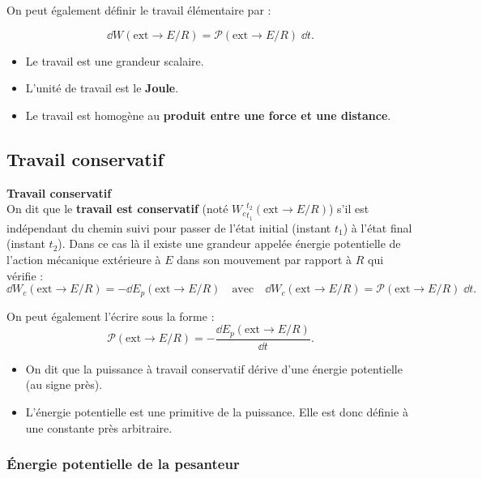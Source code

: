 \begin{rem}%
On peut également définir le travail élémentaire par :

$$\dd W(\text{ext} \rightarrow E/R)=\mathcal{P}(\text{ext} \rightarrow E/R)\;\dd t.
$$

\begin{itemize}
\item Le travail est une grandeur scalaire.
\item L'unité de travail est le \textbf{Joule}.
\item Le travail est homogène au \textbf{produit entre une force et une distance}.
\end{itemize}

\end{rem}%



\subsection{Travail conservatif}

\begin{defi}\textbf{Travail conservatif}\\
On dit que le \textbf{travail est conservatif} (noté $\displaystyle{{W_c}^{t_2}_{t_1}}(\text{ext} \rightarrow E/R)$) s'il est indépendant du chemin suivi pour passer de l'état initial (instant $t_1$) à l'état final (instant $t_2$).
Dans ce cas là il existe une grandeur appelée énergie potentielle de l'action mécanique extérieure à $E$ dans son mouvement par rapport à $R$ qui vérifie :
$$
\dd W_c(\text{ext} \rightarrow E/R)=-\dd E_p(\text{ext} \rightarrow E/R) \quad
\text{avec}
\quad
\dd W_c(\text{ext} \rightarrow E/R)=\mathcal{P}(\text{ext} \rightarrow E/R)\;\dd t.
$$

On peut également l'écrire sous la forme :
$$
\mathcal{P}(\text{ext} \rightarrow E/R)=-\frac{\dd E_p(\text{ext} \rightarrow E/R)}{\dd t}.
$$
\end{defi}

\begin{rem}%
\begin{itemize}
\item On dit que la puissance à travail conservatif dérive d'une énergie potentielle (au signe près).
\item L'énergie potentielle est une primitive de la puissance. Elle est donc définie à une constante près arbitraire.
\end{itemize}
\end{rem}%
\subsubsection{Énergie potentielle de la pesanteur}



